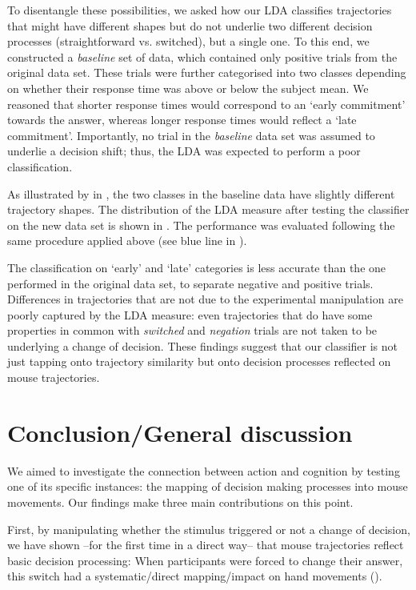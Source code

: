 \documentclass{article}
\begin{document}
To disentangle these possibilities, we asked how our LDA classifies trajectories that might have different shapes but do not underlie two different decision processes (straightforward vs. switched), but a single one.
To this end, we constructed a \emph{baseline} set of data, which contained only positive trials from the original data set. These trials were further categorised into two classes depending on whether their response time was above or below the subject mean. We reasoned that shorter response times would correspond to an `early commitment' towards the answer, whereas longer response times would reflect a `late commitment'. Importantly, no trial in the \emph{baseline} data set was assumed to underlie a decision shift; thus, the LDA was expected to perform a poor classification.  

As illustrated by in , the two classes in the baseline data have slightly different trajectory shapes.
The distribution of the LDA measure after testing the classifier on the new data set is shown in . The performance was evaluated following the same procedure applied above (see blue line in ). 

The classification on `early' and `late' categories is less accurate than the one performed in the original data set, to separate negative and positive trials.
Differences in trajectories that are not due to the experimental manipulation are poorly captured by the LDA measure: even trajectories that do have some properties in common with \emph{switched} and \emph{negation} trials are not taken to be underlying a change of decision. 
These findings suggest that our classifier is not just tapping onto trajectory similarity but onto decision processes reflected on mouse trajectories.

\section{Conclusion/General discussion}

We aimed to investigate the connection between action and cognition by testing one of its specific instances: the mapping of decision making processes into mouse movements. Our findings make three main contributions on this point. 

First, by manipulating whether the stimulus triggered or not a change of decision, we have shown --for the first time in a direct way-- that mouse trajectories reflect basic decision processing: When participants were forced to change their answer, this switch had a systematic/direct mapping/impact on hand movements (). 
\end{document}
